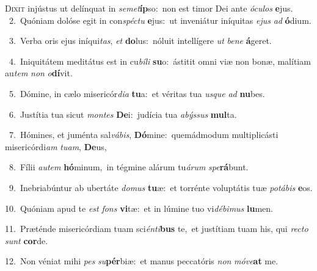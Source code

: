 \lettrine{\initial\textcolor{\initialcolor}{D}}{ixit} injústus ut delínquat in \textit{se}\-\textit{met}\textbf{íp}so:~\star non est timor Dei ante \textit{ó}\-\textit{cu}\textit{los} \textbf{e}\-jus.\\
{\numbfont\textcolor{\numbcolor}{~2.}}~Quóniam dolóse egit in con\-\textit{spéc}\-\textit{tu} \textbf{e}\-jus:~\star ut inveniátur iníquitas \textit{e}\-\textit{jus} \textit{ad} \textbf{ó}\-dium.\par
{\numbfont\textcolor{\numbcolor}{~3.}}~Verba oris ejus iníqui\-\textit{tas}\-, \textit{et} \textbf{do}\-lus:~\star nóluit intellígere \textit{ut} \textit{be}\-\textit{ne} \textbf{á}\-geret.\par
{\numbfont\textcolor{\numbcolor}{~4.}}~Iniquitátem meditátus est in cu\-\textit{bí}\-\textit{li} \textbf{su}\-o:~\star ástitit omni viæ non bonæ, malítiam au\textit{tem} \textit{non} \textit{o}\-\textbf{dí}vit.\par
{\numbfont\textcolor{\numbcolor}{~5.}}~Dómine, in cælo misericór\-\textit{di}\-\textit{a} \textbf{tu}\-a:~\star et véritas tua \textit{us}\-\textit{que} \textit{ad} \textbf{nu}\-bes.\par
{\numbfont\textcolor{\numbcolor}{~6.}}~Justítia tua sicut \textit{mon}\-\textit{tes} \textbf{De}\-i:~\star judícia tua \textit{a}\-\textit{býs}\textit{sus} \textbf{mul}\-ta.\par
{\numbfont\textcolor{\numbcolor}{~7.}}~Hómines, et juménta sal\-\textit{vá}\-\textit{bis}, \textbf{Dó}\-mine:~\star quemádmodum multiplicásti misericórdi\textit{am} \textit{tu}\-\textit{am}, \textbf{De}\-us,\par
{\numbfont\textcolor{\numbcolor}{~8.}}~Fílii \textit{au}\-\textit{tem} \textbf{hó}\-minum,~\star in tégmine alárum tu\-\textit{á}\-\textit{rum} \textit{spe}\-\textbf{rá}bunt.\par
{\numbfont\textcolor{\numbcolor}{~9.}}~Inebriabúntur ab ubertáte \textit{do}\-\textit{mus} \textbf{tu}\-æ:~\star et torrénte voluptátis tuæ \textit{po}\-\textit{tá}\textit{bis} \textbf{e}\-os.\par
{\numbfont\textcolor{\numbcolor}{10.}}~Quóniam apud te \textit{est} \textit{fons} \textbf{vi}\-tæ:~\star et in lúmine tuo vi\-\textit{dé}\-\textit{bi}\textit{mus} \textbf{lu}\-men.\par
{\numbfont\textcolor{\numbcolor}{11.}}~Præténde misericórdiam tuam sci\-\textit{én}\-\textit{ti}\textbf{bus} te,~\star et justítiam tuam his, qui \textit{rec}\-\textit{to} \textit{sunt} \textbf{cor}\-de.\par
{\numbfont\textcolor{\numbcolor}{12.}}~Non véniat mihi \textit{pes} \textit{su}\-\textbf{pér}biæ:~\star et manus peccatóris \textit{non} \textit{mó}\-\textit{ve}\textbf{at} me.\par
